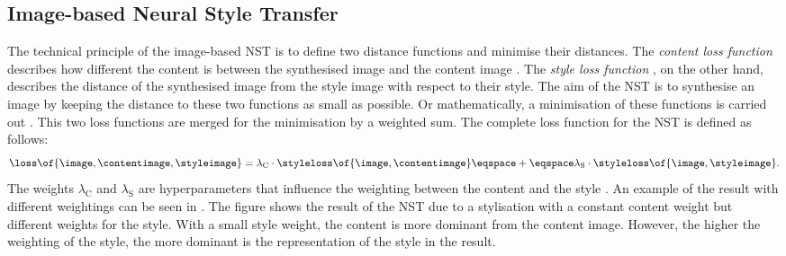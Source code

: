 \subsection{Image-based Neural Style Transfer}
The technical principle of the image-based \gls{NST} is to define two distance functions and minimise their distances. The \emph{content loss function} \contentloss{} describes how different the content is between the synthesised image \image{} and the content image \contentimage{}. The \emph{style loss function} \styleloss{}, on the other hand, describes the distance of the synthesised image \image{} from the style image \styleimage{} with respect to their style. The aim of the \gls{NST} is to synthesise an image by keeping the distance to these two functions as small as possible. Or mathematically, a minimisation of these functions is carried out \cite{Glas2021}. This two loss functions are merged for the minimisation by a weighted sum. The complete loss function \loss{} for the \gls{NST} is defined as follows:
\begin{equation*}
	\loss\of{\image\eqcommasep \contentimage\eqcommasep \styleimage} = \lambda_\text{C} \cdot \styleloss\of{\image\eqcommasep \contentimage} \eqspace+\eqspace \lambda_\text{S} \cdot \styleloss\of{\image\eqcommasep \styleimage} \eqtextdot
\end{equation*}
The weights $\lambda_\text{C}$ and $\lambda_\text{S}$ are hyperparameters that influence the weighting between the content and the style \cite{GEB2016}. An example of the result with different weightings can be seen in . The figure shows the result of the \gls{NST} due to a stylisation with a constant content weight but different weights for the style. With a small style weight, the content is more dominant from the content image. However, the higher the weighting of the style, the more dominant is the representation of the style in the result.
